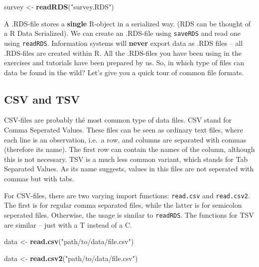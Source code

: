 \documentclass[]{tufte-book}
\newenvironment{Shaded}{}{}
\newcommand{\KeywordTok}[1]{\textcolor[rgb]{0.00,0.44,0.13}{\textbf{#1}}}
\newcommand{\NormalTok}[1]{#1}
\newcommand{\StringTok}[1]{\textcolor[rgb]{0.25,0.44,0.63}{#1}}
\begin{document}
\begin{Shaded}
\begin{Highlighting}[]
\NormalTok{survey <-}\StringTok{ }\KeywordTok{readRDS}\NormalTok{(}\StringTok{"survey.RDS"}\NormalTok{)}
\end{Highlighting}
\end{Shaded}

A .RDS-file stores a \textbf{single} R-object in a serialized way. (RDS can be thought of a R Data Serialized). We can create an .RDS-file using \texttt{saveRDS} and read one using \texttt{readRDS}. Information systems will \textbf{never} export data as .RDS files -- all .RDS-files are created within R. All the .RDS-files you have been using in the exercises and tutorials have been prepared by us. So, in which type of files can data be found in the wild? Let's give you a quick tour of common file formats.

\hypertarget{csv-and-tsv}{%
\subsection{CSV and TSV}\label{csv-and-tsv}}

CSV-files are probably thé most common type of data files. CSV stand for Comma Seperated Values. These files can be seen as ordinary text files, where each line is an observation, i.e.~a row, and columns are separated with commas (therefore its name). The first row can contain the names of the column, although this is not necessary. TSV is a much less common variant, which stands for Tab Separated Values. As its name suggests, values in this files are not seperated with commas but with tabs.

For CSV-files, there are two varying import functions: \texttt{read.csv} and \texttt{read.csv2}. The first is for regular comma separated files, while the latter is for semicolon seperated files. Otherwise, the usage is similar to \texttt{readRDS}. The functions for TSV are similar -- just with a T instead of a C.

\begin{Shaded}
\begin{Highlighting}[]
\NormalTok{data <-}\StringTok{ }\KeywordTok{read.csv}\NormalTok{(}\StringTok{"path/to/data/file.csv"}\NormalTok{)}

\NormalTok{data <-}\StringTok{ }\KeywordTok{read.csv2}\NormalTok{(}\StringTok{"path/to/data/file.csv"}\NormalTok{)}
\end{Highlighting}
\end{Shaded}
\end{document}
